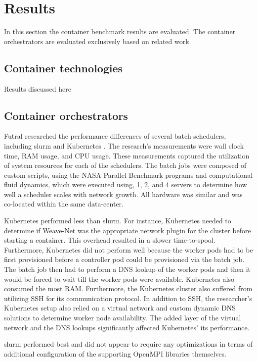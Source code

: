 \documentclass[conference]{IEEEtran}
\begin{document}
\section{Results}
In this section the container benchmark results are evaluated. The container orchestrators are evaluated exclusively based on related work.

\subsection{Container technologies}
Results discussed here



\subsection{Container orchestrators}
Futral researched the performance differences of several batch schedulers, including \gls{slurm} and Kubernetes \cite{futral2019method}. The research's measurements were wall clock time, RAM usage, and CPU usage. These measurements captured the utilization of system resources for each of the schedulers. The batch jobs were composed of custom scripts, using the NASA Parallel Benchmark programs and computational fluid dynamics, which were executed using, 1, 2, and 4 servers to determine how well a scheduler scales with network growth. All hardware was similar and was co-located within the same data-center.

Kubernetes performed less than \gls{slurm}. For instance, Kubernetes needed to determine if Weave-Net was the appropriate network plugin for the cluster before starting a container. This overhead resulted in a slower time-to-spool. Furthermore, Kubernetes did not perform well because the worker pods had to be first provisioned before a controller pod could be provisioned via the batch job. The batch job then had to perform a DNS lookup of the worker pods and then it would be forced to wait till the worker pods were available. Kubernetes also consumed the most RAM. Furthermore, the Kubernetes cluster also suffered from utilizing SSH for its communication protocol. In addition to SSH, the researcher's Kubernetes setup also relied on a virtual network and custom dynamic DNS solutions to determine worker node availability. The added layer of the virtual network and the DNS lookups significantly affected Kubernetes' its performance.

\gls{slurm} performed best and did not appear to require any optimizations in terms of additional configuration of the supporting OpenMPI libraries themselves.
\end{document}
